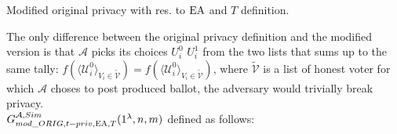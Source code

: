 \begin{definition}{ Modified original privacy with res. to $\operatorname{EA}$ and $T$ definition.}

The only difference between the original privacy definition and the modified version is that $\mathcal{A}$ picks its choices $U^0_i$ $U^1_i$ from the two lists that sums up to the same tally: $f(\langle \mathcal{U}^0_i \rangle _{V_i \in \tilde{\mathcal{V}}} ) = f(\langle \mathcal{U}^0_i \rangle _{V_i \in \tilde{\mathcal{V}}})$, where $ \tilde{\mathcal{V}}$ is a list of honest voter for which $\mathcal{A}$ choses to post produced ballot, the adversary would trivially break privacy. \\ 

$G_{mod\_ORIG,t-priv,\operatorname{EA},T}^{\mathcal{A}, Sim}(1^{\lambda},n,m)$ defined as follows:\\


\end{definition}
